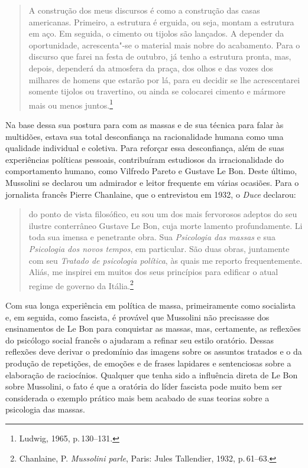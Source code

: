 \begin{quote}
A construção dos meus discursos é como a construção das casas
americanas. Primeiro, a estrutura é erguida, ou seja, montam a estrutura
em aço. Em seguida, o cimento ou tijolos são lançados. A depender da
oportunidade, acrescenta"-se o material mais nobre do acabamento. Para o
discurso que farei na festa de outubro, já tenho a estrutura pronta,
mas, depois, dependerá da atmosfera da praça, dos olhos e das vozes dos
milhares de homens que estarão por lá, para eu decidir se lhe
acrescentarei somente tijolos ou travertino, ou ainda se colocarei
cimento e mármore mais ou menos juntos.\footnote{Ludwig, 1965, p.\,130--131.}
\end{quote}

Na base dessa sua postura para com as massas e de sua técnica para falar
às multidões, estava sua total desconfiança na racionalidade humana como
uma qualidade individual e coletiva. Para reforçar essa desconfiança,
além de suas experiências políticas pessoais, contribuíram estudiosos da
irracionalidade do comportamento humano, como Vilfredo Pareto e Gustave
Le Bon. Deste último, Mussolini se declarou um admirador e leitor
frequente em várias ocasiões. Para o jornalista francês Pierre
Chanlaine, que o entrevistou em 1932, o \emph{Duce} declarou:

\begin{quote}
do ponto de vista filosófico, eu sou um dos mais fervorosos adeptos do
seu ilustre conterrâneo Gustave Le Bon, cuja morte lamento
profundamente. Li toda sua imensa e penetrante obra. Sua
\emph{Psicologia das massas} e sua \emph{Psicologia dos novos tempos},
em particular. São duas obras, juntamente com seu \emph{Tratado de
psicologia política}, às quais me reporto frequentemente. Aliás, me
inspirei em muitos dos seus princípios para edificar o atual regime de
governo da Itália.\footnote{Chanlaine, P. \emph{Mussolini parle},
  Paris: Jules Tallendier, 1932, p.\,61--63.}
\end{quote}

Com sua longa experiência em política de massa, primeiramente como
socialista e, em seguida, como fascista, é provável que Mussolini não
precisasse dos ensinamentos de Le Bon para conquistar as massas, mas,
certamente, as reflexões do psicólogo social francês o ajudaram a
refinar seu estilo oratório. Dessas reflexões deve derivar o predomínio
das imagens sobre os assuntos tratados e o da produção de repetições, de
emoções e de frases lapidares e sentenciosas sobre a elaboração de
raciocínios. Qualquer que tenha sido a influência direta de Le Bon sobre
Mussolini, o fato é que a oratória do líder fascista pode muito bem ser
considerada o exemplo prático mais bem acabado de suas teorias sobre a
psicologia das massas.

